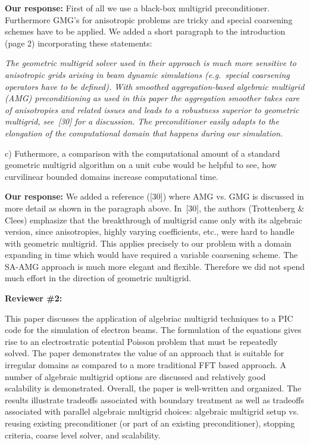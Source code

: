 \documentclass[10pt,pdftex]{report}
\begin{document}
{\textbf{Our response:}} First of all we use a black-box multigrid
preconditioner. Furthermore GMG's for anisotropic problems are tricky
and special coarsening schemes have to be applied. We added a short
paragraph to the introduction (page 2) incorporating these statements:

\textit{The geometric multigrid solver
used in their approach is much more sensitive to anisotropic grids
arising in beam dynamic simulations (e.g.\ special coarsening operators
have to be defined).  With smoothed aggregation-based algebraic
multigrid (AMG) preconditioning as used in this paper the aggregation
smoother takes care of anisotropies and related issues and leads to a
robustness superior to geometric multigrid, see~[30] for a
discussion.  The preconditioner easily adapts to the elongation  of the
computational domain that happens during our simulation.
}

c) Futhermore, a comparison with the computational amount of a standard
geometric multigrid algorithm on a unit cube would be helpful to see, how
curvilinear bounded domains increase computational time.

{\textbf{Our response:}} We added a reference ([30]) where AMG vs. GMG
is discussed in more detail as shown in the paragraph above.  In~[30],
the authors (Trottenberg \& Clees) emphasize that the breakthrough of
multigrid came only with its algebraic version, since anisotropies,
highly varying coefficients, etc., were hard to handle with geometric
multigrid.  This applies precisely to our problem with a domain
expanding in time which would have required a variable coarsening
scheme.  The SA-AMG approach is much more elegant and flexible.
Therefore we did not spend much effort in the direction of geometric
multigrid.

\pagebreak

{\bf Reviewer \#2: }

This paper discusses the application of algebriac multigrid techniques to a PIC
code for the simulation of electron beams. The formulation of the equations
gives rise to an electrostratic potential  Poisson problem that must be
repeatedly solved. The paper demonstrates the value of an approach that is
suitable for irregular domains as compared to a more traditional FFT based
approach. A number of algebraic multigrid options are discussed and relatively
good scalability is demonstrated.  Overall, the paper is well-written and
organized. The results illustrate tradeoffs associated with boundary treatment
as well as tradeoffs associated with parallel algebraic multigrid choices:
algebraic multigrid setup vs. reusing existing preconditioner (or part of an
existing preconditioner), stopping criteria, coarse level solver, and
scalability.  
\end{document}
